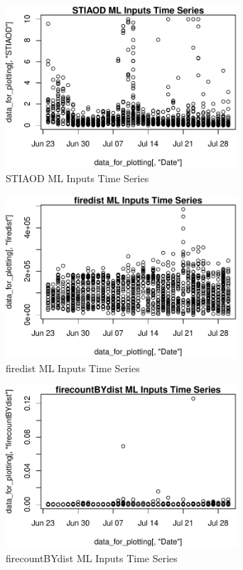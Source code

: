 \begin{figure} 
\centering  
\includegraphics[width=0.77\textwidth]{Code_Outputs/ML_input_report_AllforCaret_cleaned_StepPractice_part_practice_STIAODTS.pdf} 
\caption{\label{fig:ML_input_report_AllforCaret_cleaned_StepPractice_part_practiceSTIAODTS}STIAOD ML Inputs Time Series} 
\end{figure} 
 

\begin{figure} 
\centering  
\includegraphics[width=0.77\textwidth]{Code_Outputs/ML_input_report_AllforCaret_cleaned_StepPractice_part_practice_firedistTS.pdf} 
\caption{\label{fig:ML_input_report_AllforCaret_cleaned_StepPractice_part_practicefiredistTS}firedist ML Inputs Time Series} 
\end{figure} 
 

\begin{figure} 
\centering  
\includegraphics[width=0.77\textwidth]{Code_Outputs/ML_input_report_AllforCaret_cleaned_StepPractice_part_practice_firecountBYdistTS.pdf} 
\caption{\label{fig:ML_input_report_AllforCaret_cleaned_StepPractice_part_practicefirecountBYdistTS}firecountBYdist ML Inputs Time Series} 
\end{figure} 
 

